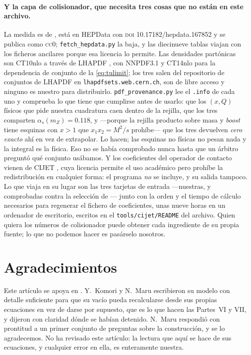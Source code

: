 \documentclass[11pt,a4paper]{article}
\begin{document}
\paragraph{Y la capa de colisionador, que necesita tres cosas que no están en este archivo.} La
medida es de \cite{CMSangular}, está en HEPData con \textsc{doi} 10.17182/hepdata.167852 y se
publica como \textsc{cc0}; \texttt{fetch\_\allowbreak hepdata.py} la baja, y las diecinueve
tablas viajan con los ficheros ancilares porque esa licencia lo permite. Las densidades
partónicas son CT10nlo \cite{CT10} a través de LHAPDF \cite{LHAPDF}, con NNPDF3.1 \cite{NNPDF31} y
CT14nlo \cite{CT14} para la dependencia de conjunto de la \eqref{eq:tulimit}; los tres salen del
repositorio de conjuntos de LHAPDF en \texttt{lhapdfsets.web.cern.ch}, son de libre acceso y
ninguno es nuestro para distribuirlo. \texttt{pdf\_\allowbreak provenance.py} lee el
\texttt{.info} de cada uno y comprueba lo que tiene que cumplirse antes de usarlo: que los $(x,Q)$
físicos que pide nuestra cuadratura caen dentro de la rejilla, que los tres comparten
$\alpha_s(m_Z)=0.118$, y ---porque la rejilla producto sobre masa y \emph{boost} tiene esquinas con
$x>1$ que $x_1x_2=M^2/s$ prohíbe--- que los tres devuelven \emph{cero exacto} ahí en vez de
extrapolar. Lo hacen; las esquinas no físicas no pesan nada y la integral es la física. Eso no se
había comprobado nunca hasta que un árbitro preguntó qué conjunto usábamos.
Y los coeficientes del operador de contacto vienen de CIJET
\cite{CIJET}, cuya licencia permite el uso académico pero prohíbe la redistribución en cualquier
forma: el programa \emph{no} se incluye, y su salida tampoco. Lo que viaja en su lugar son las
tres tarjetas de entrada ---nuestras, y comprobadas contra la selección de \cite{CMSangular}---
junto con la orden y el tiempo de cálculo necesarios para regenerar el fichero de coeficientes,
unas nueve horas en un ordenador de escritorio, escritos en el \texttt{tools/cijet/README} del
archivo. Quien quiera los números de colisionador puede obtener cada ingrediente de su propia
fuente; lo que no podemos hacer es pasárselo nosotros.

\endgroup

\section*{Agradecimientos}

Este artículo se apoya en \cite{KM25}. Y.~Komori y N.~Maru escribieron su modelo con detalle
suficiente para que su vacío pueda recalcularse desde sus propias ecuaciones en vez de darse por
supuesto, que es lo que hacen las Partes~VI y VII, y dijeron con claridad dónde se habían detenido.
N.~Maru respondió con prontitud a un primer conjunto de preguntas sobre la construcción, y se lo
agradecemos. No ha revisado este artículo: la lectura que aquí se hace de sus ecuaciones, y
cualquier error en ella, es enteramente nuestra.
\end{document}
